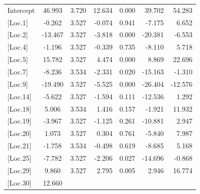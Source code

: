 \begin{longtable}{@{\extracolsep{\fill}}p{2.8cm}clrrrr@{}}
	Intercept  & 46.993  & 3.720 & 12.634 & 0.000 & 39.702  & 54.283  \\
	{[}Loc.1{]}  & -0.262  & 3.527 & -0.074 & 0.941 & -7.175  & 6.652   \\
	\rowstyle{\bfseries} {[}Loc.2{]}  &
	\rowstyle{\bfseries} -13.467 & 
	\rowstyle{\bfseries} 3.527 & 
	\rowstyle{\bfseries} -3.818 & 
	\rowstyle{\bfseries} 0.000 & 
	\rowstyle{\bfseries} -20.381 & 
	\rowstyle{\bfseries} -6.553  \\
	{[}Loc.4{]}  & -1.196  & 3.527 & -0.339 & 0.735 & -8.110  & 5.718   \\
	\rowstyle{\bfseries} {[}Loc.5{]}  & 
	\rowstyle{\bfseries} 15.782  & 
	\rowstyle{\bfseries} 3.527 & 
	\rowstyle{\bfseries} 4.474  & 
	\rowstyle{\bfseries} 0.000 & 
	\rowstyle{\bfseries} 8.869   & 
	\rowstyle{\bfseries} 22.696  \\
	\rowstyle{\bfseries} {[}Loc.7{]}  & 
	\rowstyle{\bfseries} -8.236  & 
	\rowstyle{\bfseries} 3.534 & 
	\rowstyle{\bfseries} -2.331 & 
	\rowstyle{\bfseries} 0.020 & 
	\rowstyle{\bfseries} -15.163 & 
	\rowstyle{\bfseries} -1.310  \\
	\rowstyle{\bfseries} {[}Loc.9{]}  & 
	\rowstyle{\bfseries} -19.490 & 
	\rowstyle{\bfseries} 3.527 & 
	\rowstyle{\bfseries} -5.525 & 
	\rowstyle{\bfseries} 0.000 & 
	\rowstyle{\bfseries} -26.404 & 
	\rowstyle{\bfseries} -12.576 \\
	{[}Loc.14{]} & -5.622  & 3.527 & -1.594 & 0.111 & -12.536 & 1.292   \\
	{[}Loc.18{]} & 5.006   & 3.534 & 1.416  & 0.157 & -1.921  & 11.932  \\
	{[}Loc.19{]} & -3.967  & 3.527 & -1.125 & 0.261 & -10.881 & 2.947   \\
	{[}Loc.20{]} & 1.073   & 3.527 & 0.304  & 0.761 & -5.840  & 7.987   \\
	{[}Loc.21{]} & -1.758  & 3.534 & -0.498 & 0.619 & -8.685  & 5.168   \\
	\rowstyle{\bfseries} {[}Loc.25{]} & 
	\rowstyle{\bfseries} -7.782  & 
	\rowstyle{\bfseries} 3.527 & 
	\rowstyle{\bfseries} -2.206 & 
	\rowstyle{\bfseries} 0.027 & 
	\rowstyle{\bfseries} -14.696 & 
	\rowstyle{\bfseries} -0.868  \\
	\rowstyle{\bfseries} {[}Loc.29{]} & 
	\rowstyle{\bfseries} 9.860   & 
	\rowstyle{\bfseries} 3.527 & 
	\rowstyle{\bfseries} 2.795  & 
	\rowstyle{\bfseries} 0.005 & 
	\rowstyle{\bfseries} 2.946   & 
	\rowstyle{\bfseries} 16.774  \\
	\rowstyle{\bfseries} 
	\rowstyle{\bfseries} {[}Loc.30{]} & 
	\rowstyle{\bfseries} 12.660  & 

\end{longtable}
